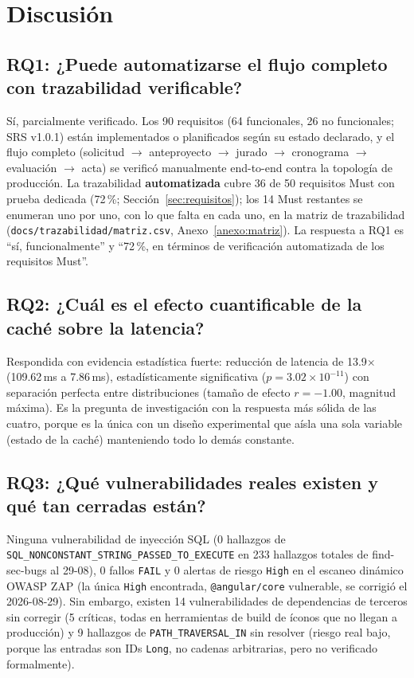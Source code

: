\section{Discusión}
\label{sec:discusion}

\subsection*{RQ1: ¿Puede automatizarse el flujo completo con trazabilidad verificable?}
Sí, parcialmente verificado. Los 90 requisitos (64 funcionales, 26 no funcionales; SRS v1.0.1) están
implementados o planificados según su estado declarado, y el flujo completo
(solicitud $\to$ anteproyecto $\to$ jurado $\to$ cronograma $\to$ evaluación $\to$
acta) se verificó manualmente end-to-end contra la topología de producción. La trazabilidad
\textbf{automatizada} cubre 36 de 50 requisitos Must con prueba dedicada (72\,\%; Sección~\ref{sec:requisitos});
los 14 Must restantes se enumeran uno por uno, con lo que falta en cada uno, en la matriz de trazabilidad
(\texttt{docs/trazabilidad/matriz.csv}, Anexo~\ref{anexo:matriz}). La respuesta a RQ1 es ``sí, funcionalmente'' y
``72\,\%, en términos de verificación automatizada de los requisitos Must''.

\subsection*{RQ2: ¿Cuál es el efecto cuantificable de la caché sobre la latencia?}
Respondida con evidencia estadística fuerte: reducción de latencia de 13.9$\times$ (109.62\,ms a
7.86\,ms), estadísticamente significativa ($p = 3.02\times10^{-11}$) con separación perfecta entre
distribuciones (tamaño de efecto $r=-1.00$, magnitud máxima). Es la pregunta de investigación con la respuesta más sólida
de las cuatro, porque es la única con un diseño experimental que aísla una sola variable (estado de la
caché) manteniendo todo lo demás constante.

\subsection*{RQ3: ¿Qué vulnerabilidades reales existen y qué tan cerradas están?}
Ninguna vulnerabilidad de inyección SQL (0 hallazgos de \texttt{SQL\_NONCONSTANT\_STRING\_PASSED\_TO\_EXECUTE}
en 233 hallazgos totales de find-sec-bugs al 29-08), 0 fallos \texttt{FAIL} y 0 alertas de riesgo \texttt{High} en
el escaneo dinámico OWASP ZAP (la única \texttt{High} encontrada, \texttt{@angular/core} vulnerable, se
corrigió el 2026-08-29). Sin embargo, existen 14 vulnerabilidades de dependencias de terceros sin
corregir (5 críticas, todas en herramientas de build de íconos que no llegan a producción) y 9 hallazgos
de \texttt{PATH\_TRAVERSAL\_IN} sin resolver (riesgo real bajo, porque las entradas son IDs \texttt{Long},
no cadenas arbitrarias, pero no verificado formalmente).

